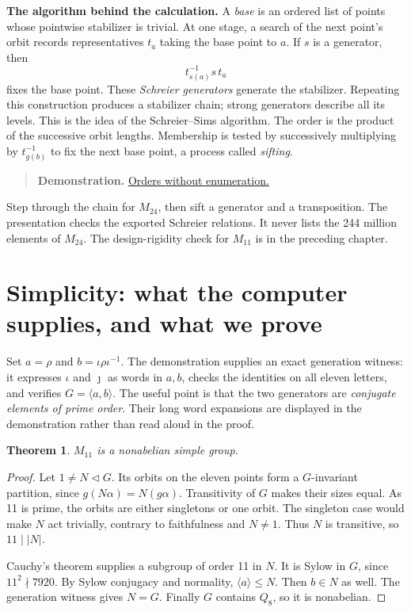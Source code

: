 \documentclass[12pt,letterpaper]{article}
\newtheorem{theorem}{Theorem}[section]
\theoremstyle{definition}
\theoremstyle{remark}
\newenvironment{toolnote}{\begin{quote}\small\color{navy}}{\end{quote}}
\newcommand{\pageheading}[1]{\clearpage\section{#1}}
\newcommand{\demolink}[2]{\href{https://gtevelev-max.github.io/mathieu/\##1}{#2}}
\newcommand{\demobox}[2]{\begin{toolnote}\textbf{Demonstration.} \demolink{#1}{#2}\end{toolnote}}
\begin{document}
\textbf{The algorithm behind the calculation.} A \emph{base} is an ordered list of points whose pointwise stabilizer is trivial. At one stage, a search of the next point's orbit records representatives $t_a$ taking the base point to $a$. If $s$ is a generator, then
\[
 t_{s(a)}^{-1}s\,t_a
\]
fixes the base point. These \emph{Schreier generators} generate the stabilizer. Repeating this construction produces a stabilizer chain; strong generators describe all its levels. This is the idea of the Schreier--Sims algorithm. The order is the product of the successive orbit lengths. Membership is tested by successively multiplying by $t_{g(b)}^{-1}$ to fix the next base point, a process called \emph{sifting}.

\demobox{orders?group=24}{Orders without enumeration.} Step through the chain for $M_{24}$, then sift a generator and a transposition. The presentation checks the exported Schreier relations. It never lists the 244 million elements of $M_{24}$. The design-rigidity check for $M_{11}$ is in the preceding chapter.

\hypertarget{simplicity}{}
\pageheading{Simplicity: what the computer supplies, and what we prove}
Set $a=\rho$ and $b=\iota\rho\iota^{-1}$. The demonstration supplies an exact generation witness: it expresses $\iota$ and $\jmath$ as words in $a,b$, checks the identities on all eleven letters, and verifies $G=\langle a,b\rangle$. The useful point is that the two generators are \emph{conjugate elements of prime order}. Their long word expansions are displayed in the demonstration rather than read aloud in the proof.

\begin{theorem}
$M_{11}$ is a nonabelian simple group.
\end{theorem}
\begin{proof}
Let $1\ne N\lhd G$. Its orbits on the eleven points form a $G$-invariant partition, since $g(N\alpha)=N(g\alpha)$. Transitivity of $G$ makes their sizes equal. As 11 is prime, the orbits are either singletons or one orbit. The singleton case would make $N$ act trivially, contrary to faithfulness and $N\ne1$. Thus $N$ is transitive, so $11\mid|N|$.

Cauchy's theorem supplies a subgroup of order 11 in $N$. It is Sylow in $G$, since $11^2\nmid7920$. By Sylow conjugacy and normality, $\langle a\rangle\le N$. Then $b\in N$ as well. The generation witness gives $N=G$. Finally $G$ contains $Q_8$, so it is nonabelian.
\end{proof}
\end{document}
